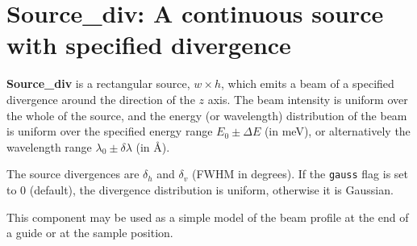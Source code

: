 \section{Source\_div: A continuous source with specified divergence}
\label{source-div}


\textbf{Source\_div} is a rectangular source, $w \times h$, which emits a
beam of a specified divergence around the direction of the $z$ axis.
The beam intensity is uniform over
the whole of the source, and the energy (or wavelength) distribution
of the beam is uniform over the specified energy range
$E_0 \pm \Delta E$ (in meV), or alternatively
the wavelength range $\lambda_0 \pm \delta\lambda$ (in \AA ).

The source divergences are $\delta_h$ and $\delta_v$ (FWHM in degrees).
If the \verb+gauss+ flag is set to 0 (default),
the divergence distribution is uniform, otherwise it is Gaussian.

This component may be used as a simple model of the
beam profile at the end of a guide or at the sample position.

